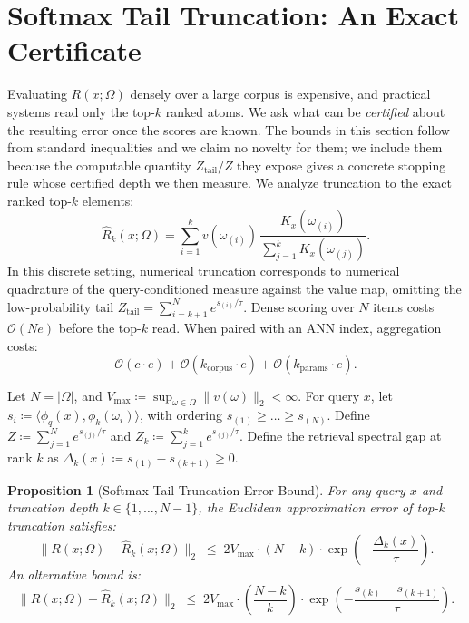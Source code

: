 \documentclass[preprint,12pt]{elsarticle}
\newtheorem{proposition}{Proposition}
\newcommand{\Om}{\Omega}
\newcommand{\rev}[1]{#1}
\begin{document}
\section{Softmax Tail Truncation: An Exact Certificate}
\label{sec:quadrature}

Evaluating $R(x; \Om)$ densely over a large corpus is expensive, and practical systems read only the top-$k$ ranked atoms. We ask what can be \emph{certified} about the resulting error once the scores are known. \rev{The bounds in this section follow from standard inequalities and we claim no novelty for them; we include them because the computable quantity $Z_{\mathrm{tail}}/Z$ they expose gives a concrete stopping rule whose certified depth we then measure.} We analyze truncation to the exact ranked top-$k$ elements:
\[
  \hat{R}_k(x; \Om) = \sum_{i=1}^k v(\omega_{(i)})\, \frac{K_x(\omega_{(i)})}{\sum_{j=1}^k K_x(\omega_{(j)})}.
\]
In this discrete setting, numerical truncation corresponds to numerical quadrature of the query-conditioned measure against the value map, omitting the low-probability tail $Z_{\mathrm{tail}} = \sum_{i=k+1}^N e^{s_{(i)}/\tau}$. Dense scoring over $N$ items costs $\mathcal{O}(Ne)$ before the top-$k$ read. When paired with an ANN index, aggregation costs:
\[
  \mathcal{O}(c \cdot e) + \mathcal{O}(k_{\mathrm{corpus}} \cdot e) + \mathcal{O}(k_{\mathrm{params}} \cdot e).
\]

Let $N = |\Om|$, and $V_{\max} \coloneqq \sup_{\omega \in \Om} \|v(\omega)\|_2 < \infty$. For query $x$, let $s_i \coloneqq \langle \phi_q(x), \phi_k(\omega_i) \rangle$, with ordering $s_{(1)} \ge \dots \ge s_{(N)}$. Define $Z \coloneqq \sum_{j=1}^N e^{s_{(j)}/\tau}$ and $Z_k \coloneqq \sum_{j=1}^k e^{s_{(j)}/\tau}$. Define the retrieval spectral gap at rank $k$ as $\Delta_k(x) \coloneqq s_{(1)} - s_{(k+1)} \ge 0$.

\begin{proposition}[Softmax Tail Truncation Error Bound]
\label{thm:quadrature_bound}
For any query $x$ and truncation depth $k \in \{1, \dots, N-1\}$, the Euclidean approximation error of top-$k$ truncation satisfies:
\[
  \| R(x; \Om) - \hat{R}_k(x; \Om) \|_2 \;\le\; 2 V_{\max} \cdot (N - k) \cdot \exp\left( -\frac{\Delta_k(x)}{\tau} \right).
\]
An alternative bound is:
\[
  \| R(x; \Om) - \hat{R}_k(x; \Om) \|_2 \;\le\; 2 V_{\max} \cdot \left(\frac{N - k}{k}\right) \cdot \exp\left( -\frac{s_{(k)} - s_{(k+1)}}{\tau} \right).
\]
\end{proposition}
\end{document}
